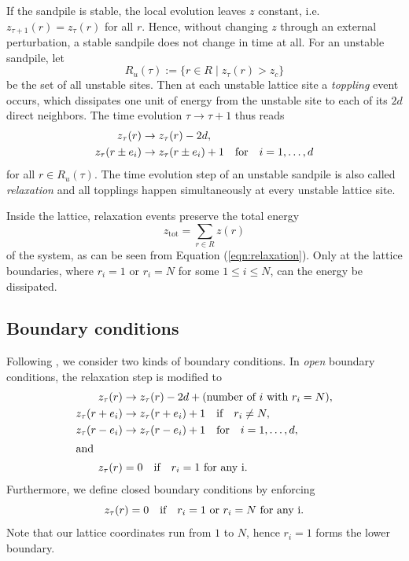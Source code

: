 If the sandpile is stable, the local evolution leaves $z$ constant, i.e. $z_{\tau+1}(r) = z_\tau(r)$ for all $r$. Hence, without changing $z$ through an external perturbation, a stable sandpile does not change in time at all. For an unstable sandpile, let
\begin{equation}
    R_u(\tau) := \{r\in R \mid z_\tau(r) > z_c\}
\end{equation}
be the set of all unstable sites. Then at each unstable lattice site a \emph{toppling} event occurs, which dissipates one unit of energy from the unstable site to each of its $2d$ direct neighbors. The time evolution $\tau\to\tau+1$ thus reads
\begin{align}
    z_\tau(r) &\to z_\tau(r) - 2d, \label{eqn:relaxation} \\
    z_\tau(r\pm e_i) &\to z_\tau(r\pm e_i) + 1 \qq{for} i=1,\ldots,d \nonumber
\end{align}
for all $r\in R_u(\tau)$. The time evolution step of an unstable sandpile is also called \emph{relaxation} and all topplings happen simultaneously at every unstable lattice site.

Inside the lattice, relaxation events preserve the total energy
\begin{equation}
    z_\mathrm{tot} = \sum_{r\in R}z(r)
\end{equation}
of the system, as can be seen from Equation (\ref{eqn:relaxation}). Only at the lattice boundaries, where $r_i=1$ or $r_i=N$ for some $1\leq i\leq N$, can the energy be dissipated.

\subsection{Boundary conditions}

Following \cite{christensen1991dynamical}, we consider two kinds of boundary conditions. In \emph{open} boundary conditions, the relaxation step is modified to
\begin{align}
    z_\tau(r) &\to z_\tau(r) - 2d + (\text{number of }i\text{ with }r_i=N), \nonumber \\
    z_\tau(r+e_i) &\to z_\tau(r+e_i) + 1 \qq{if} r_i\neq N, \\
    z_\tau(r-e_i) &\to z_\tau(r-e_i) + 1 \qq{for} i=1,\ldots,d, \nonumber \\
\intertext{and}
    z_\tau(r) &= 0 \qq{if} r_i=1 \text{ for any i}. \nonumber
\end{align}
Furthermore, we define closed boundary conditions by enforcing
\begin{equation}
    z_\tau(r) = 0 \qq{if} r_i=1\text{ or } r_i=N \text{ for any i}.
\end{equation}
Note that our lattice coordinates run from $1$ to $N$, hence $r_i=1$ forms the lower boundary.


